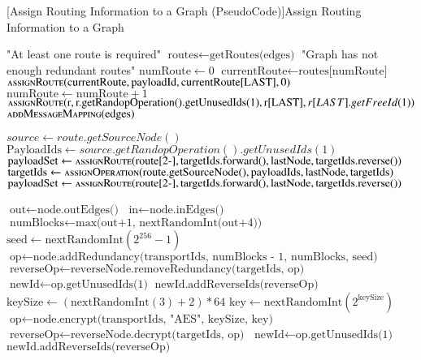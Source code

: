 \begin{algorithm}
	[Assign Routing Information to a Graph (PseudoCode)]{Assign Routing Information to a Graph}\label{alg:simpleRouting}
	\begin{algorithmic}[1]
				\Throw "At least one route is required"
			\EndIf
			\State $\text{routes} \gets \text{getRoutes(edges)}$
				\Throw "Graph has not enough redundant routes"
			\EndIf
			\State $\text{numRoute} \gets 0$
				\State $\text{currentRoute} \gets \text{routes[numRoute]}$
				\State $\Call{assignRoute}{\text{currentRoute}, \text{payloadId}, \text{currentRoute[LAST]},0}$
				\State $\text{numRoute} \gets \text{numRoute} + 1$
			\EndWhile
				\State $\Call{assignRoute}{\text{r}, \text{r.getRandopOperation().getUnusedIds(1)}, \text{r[LAST]},r[LAST].getFreeId(1)}$
			\EndFor
			\State $\Call{addMessageMapping}{\text{edges}}$
		\EndFunction
		\item[]		
			\State $source \gets route.getSourceNode()$
				\State $\text{PayloadIds} \gets source.getRandopOperation().getUnusedIds(1)$
				\State $\text{payloadSet} \gets \Call{assignRoute}{\text{route[2-]}, \text{targetIds.forward()}, \text{lastNode}, \text{targetIds.reverse()}}$
			\Else
				\State $\text{targetIds}  \gets \Call{assignOperation}{\text{route.getSourceNode()}, \text{payloadIds}, \text{lastNode}, \text{targetIds}}$
				\State $\text{payloadSet} \gets \Call{assignRoute}{\text{route[2-]}, \text{targetIds.forward()}, \text{lastNode}, \text{targetIds.reverse()}}$
			\EndIf	
		\EndFunction
		\item[]		
		    \State $\text{out} \gets \text{node.outEdges()}$
		    \State $\text{in} \gets \text{node.inEdges()}$
				\State $\text{numBlocks} \gets \text{max(out+1, nextRandomInt(out+4))}$
				\State $\text{seed} \gets \text{nextRandomInt}(2^{256}-1)$
				\State $\text{op} \gets \text{node.addRedundancy(transportIds, numBlocks - 1, numBlocks, seed)}$
				\State $\text{reverseOp} \gets \text{reverseNode.removeRedundancy(targetIds, op)}$
				\State $\text{newId} \gets \text{op.getUnusedIds(1)}$
				\State $\text{newId.addReverseIds(reverseOp)}$
			\Else
				\State $\text{keySize}   \gets (\text{nextRandomInt}(3)+2)*64$
				\State $\text{key}       \gets \text{nextRandomInt}(2^{\text{keySize}})$
				\State $\text{op}        \gets \text{node.encrypt(transportIds, "AES", keySize, key)}$
				\State $\text{reverseOp} \gets \text{reverseNode.decrypt(targetIds, op)}$
				\State $\text{newId}     \gets \text{op.getUnusedIds(1)}$
				\State $\text{newId.addReverseIds(reverseOp)}$
			\EndIf
		\EndProcedure
	\end{algorithmic}
\end{algorithm}

